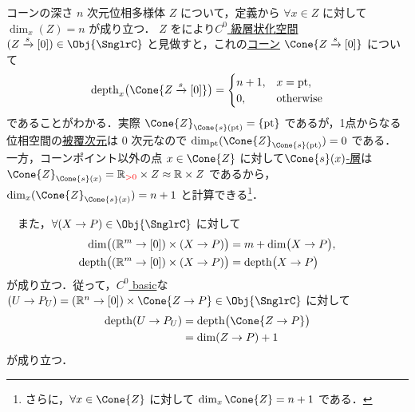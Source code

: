 \documentclass[TQFT_main]{subfiles}
\begin{document}
\begin{myexample}[label=ex:depth-Cone]{コーンの深さ}
    $n$ 次元位相多様体 $Z$ について，定義から $\forall x \in Z$ に対して $\dim_x(Z) = n$ が成り立つ．
    $Z$ をにより\hyperref[def:Snglr-C0]{$C^0$ 級層状化空間} $(Z \xrightarrow{s} [0]) \in \Obj{\SnglrC}$ と見做すと，これの\hyperref[def:str-cone]{コーン} $\Cone{Z \xrightarrow{s} [0]}$ について
    \begin{align}
        \depth_x \bigl( \Cone{Z \xrightarrow{s} [0]} \bigr) 
        =
        \begin{cases}
            n+1, &x = \mathrm{pt}, \\
            0, &\text{otherwise}
        \end{cases}
    \end{align}
    であることがわかる．実際 $\Cone{Z}_{\Cone{s}(\mathrm{pt})} = \{\mathrm{pt}\}$ であるが，1点からなる位相空間の\hyperref[def:covering-dim]{被覆次元}は $0$ 次元なので $\dim_{\mathrm{pt}} (\Cone{Z}_{\Cone{s}(\mathrm{pt})}) = 0$ である．
    一方，コーンポイント以外の点 $x \in \Cone{Z}$ に対して\hyperref[def:stratified-space]{$\Cone{s}(x)$-層}は
    $\Cone{Z}_{\Cone{s}(x)} = \mathbb{R}_{\textcolor{red}{> 0}} \times Z \approx \mathbb{R} \times Z$ であるから，
    $\dim_{x} (\Cone{Z}_{\Cone{s}(x)}) = n + 1$ と計算できる\footnote{さらに，$\forall x \in \Cone{Z}$ に対して $\dim_{x} \Cone{Z} = n+1$ である．}．
    
    　また，$\forall (X \to P) \in \Obj{\SnglrC}$ に対して
    \begin{align}
        \dim \bigl( (\mathbb{R}^m \to [0]) \times (X \to P) \bigr) &= m + \dim \bigl( X \to P \bigr), \\
        \operatorname{depth} \bigl( (\mathbb{R}^m \to [0]) \times (X \to P) \bigr) &= \operatorname{depth} \bigl( X \to P \bigr) 
    \end{align}
    が成り立つ．従って，\hyperref[def:C0-basic]{$C^0$ basic}な $(U \to P_U) = (\mathbb{R}^n \to [0]) \times \Cone{Z \to P} \in \Obj{\SnglrC}$ に対して
    \begin{align}
        \depth (U \to P_U) 
        &= \depth \bigl( \Cone{Z \to P} \bigr)  \\
        &= \dim (Z \to P) + 1
    \end{align}
    が成り立つ．
\end{myexample}
\end{document}
